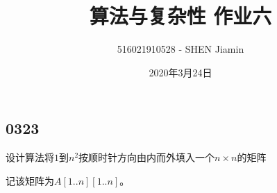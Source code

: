\documentclass[answers]{exam}
\title{算法与复杂性 \quad 作业六}
\author{516021910528 - SHEN Jiamin}
\date{2020年3月24日}
\begin{document}
    \maketitle

    \begin{questions}
        \section{0323}\label{sec:0323}

        \question 设计算法将$1$到$n^2$按顺时针方向由内而外填入一个$n \times n$的矩阵


        \begin{solution}
            记该矩阵为$A[1..n][1..n]$。


\end{solution}
\end{questions}
\end{document}
